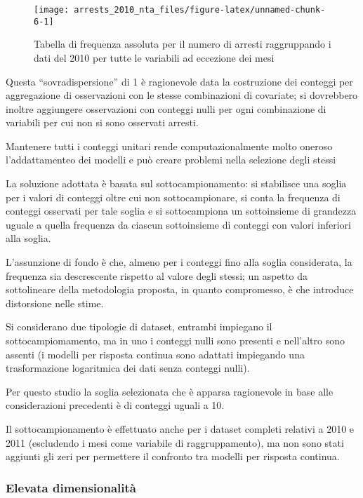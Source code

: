 \documentclass[
  ,
]{article}
\begin{document}
\begin{figure}

{\centering \texttt{[image: arrests\_2010\_nta\_files/figure-latex/unnamed-chunk-6-1]} 

}

\caption{Tabella di frequenza assoluta per il numero di arresti raggruppando i dati del 2010 per tutte le variabili ad eccezione dei mesi}\label{fig:unnamed-chunk-6}
\end{figure}

Questa ``sovradispersione'' di 1 è ragionevole data la costruzione dei conteggi per aggregazione di osservazioni con le stesse combinazioni di covariate; si dovrebbero inoltre aggiungere osservazioni con conteggi nulli per ogni combinazione di variabili per cui non si sono osservati arresti.

Mantenere tutti i conteggi unitari rende computazionalmente molto oneroso l'addattamenteo dei modelli e può creare problemi nella selezione degli stessi

La soluzione adottata è basata sul sottocampionamento: si stabilisce una soglia per i valori di conteggi oltre cui non sottocampionare, si conta la frequenza di conteggi osservati per tale soglia e si sottocampiona un sottoinsieme di grandezza uguale a quella frequenza da ciascun sottoinsieme di conteggi con valori inferiori alla soglia.

L'assunzione di fondo è che, almeno per i conteggi fino alla soglia considerata, la frequenza sia descrescente rispetto al valore degli stessi; un aspetto da sottolineare della metodologia proposta, in quanto compromesso, è che introduce distorsione nelle stime.

Si considerano due tipologie di dataset, entrambi impiegano il sottocampiomamento, ma in uno i conteggi nulli sono presenti e nell'altro sono assenti (i modelli per risposta continua sono adattati impiegando una trasformazione logaritmica dei dati senza conteggi nulli).

Per questo studio la soglia selezionata che è apparsa ragionevole in base alle considerazioni precedenti è di conteggi uguali a 10.

Il sottocampionamento è effettuato anche per i dataset completi relativi a 2010 e 2011 (escludendo i mesi come variabile di raggruppamento), ma non sono stati aggiunti gli zeri per permettere il confronto tra modelli per risposta continua.

\hypertarget{elevata-dimensionalituxe0}{%
\subsubsection{Elevata dimensionalità}\label{elevata-dimensionalituxe0}}
\end{document}
